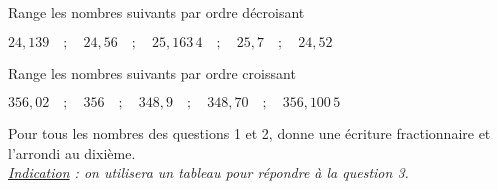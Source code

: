 \begin{myenumerate}
\item Range les nombres suivants par ordre décroisant
\par\centerline{$24,139\quad;\quad24,56\quad;\quad25,163\,4
\quad;\quad25,7\quad;\quad24,52$}
\item Range les nombres suivants par ordre croissant
\par\centerline{$356,02\quad;\quad356\quad;\quad348,9
\quad;\quad348,70\quad;\quad356,100\,5$}
\item Pour tous les nombres des questions 1 et 2, donne une écriture
fractionnaire et l'arrondi au dixième.
\\{\small\em\underline{Indication} : on utilisera un tableau pour
répondre à la question 3.}
\end{myenumerate}
